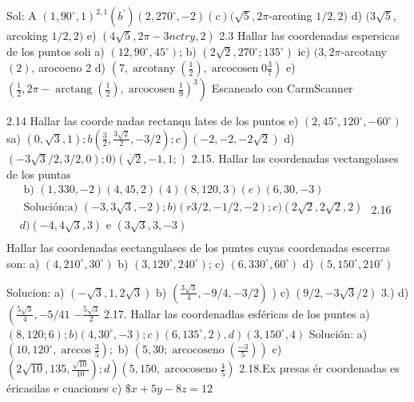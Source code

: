 Sol: A $\left(1,90^{\circ}, 1\right)^{2,1}\left(b^{\prime}\right)\left(2,270^{\circ},-2\right)(c)(\sqrt{5}, 2 \pi$-arcoting $1 / 2,2)$
d) $(3 \sqrt{5}$, arcoking $1 / 2,2)$ e) $(4 \sqrt{5}, 2 \pi-3 n c t r y, 2)$
2.3 Hallar las coordenadas espersicas de los puntos
soli a) $\left(12,90^{\circ}, 45^{\circ}\right)$; b) $\left(2 \sqrt{2}, 270^{\circ} ; 135^{\circ}\right)$ ic) $(3,2 \pi$-arcotany $(2)$, arocoeno 2 d) $\left(7, \operatorname{arcotany}\left(\frac{1}{2}\right), \operatorname{arcocosen} 0 \frac{3}{7}\right)$ e) $\left.\left(\frac{1}{2}, 2 \pi-\operatorname{arctang}\left(\frac{1}{2}\right), \operatorname{arcocosen} \frac{1}{9}\right)^3\right)$
Escaneado con CarmScanner




2.14 Hallar las coorde nadas rectanqu lates de los puntos
e) $\left(2,45^{\circ}, 120^{\circ},-60^{\circ}\right)$
sa) $\left.(0, \sqrt{3}, 1) ; b\left(\frac{3}{2}, \frac{3 \sqrt{2}}{2},-3 / 2\right) ; c\right)(-2,-2,-2 \sqrt{2})$
d) $(-3 \sqrt{3} / 2,3 / 2,0) ; 0)(\sqrt{2},-1,1 ;)$
2.15. Hallar las coordenadas vectangolases de los puntas
$\begin{aligned} & \text { b) }(1,330,-2)(4,45,2)(4)(8,120,3)(e)(6,30,-3) \\ &\text { Solución:a) }(-3,3 \sqrt{3},-2) ; b)(r 3 / 2,-1 / 2,-2) ; c)(2 \sqrt{2}, 2 \sqrt{2}, 2) \\ &d)(-4,4 \sqrt{3}, 3) \text { e }(3 \sqrt{3}, 3,-3) \\ &\end{aligned}$
2.16 Hallar las coordenadas eectangulases de los puntes cuyas coordenadas escerras son: a) $\left(4,210^{\circ}, 30^{\circ}\right)$
b) $\left(3,120^{\circ}, 240^{\circ}\right)$; c) $\left(6,330^{\circ}, 60^{\circ}\right)$ d) $\left(5,150^{\circ}, 210^{\circ}\right)$

Solucion: a) $(-\sqrt{3}, 1,2 \sqrt{3})$ b) $\left(\frac{3 \sqrt{3}}{4},-9 / 4,-3 / 2\right)$
)
c) $(9 / 2,-3 \sqrt{3} / 2)$
3.) d) $\left(\frac{5 \sqrt{3}}{4},-5 / 41\right.$
$-\frac{5 \sqrt{3}}{2}$
2.17. Hallar las coordenadlas esféricas de los puntes a) $\left.\left.(8,120 ; 6) ; b)\left(4,30^{\circ},-3\right) ; c\right)\left(6,135^{\circ}, 2\right), d\right)\left(3,150^{\circ}, 4\right)$ Solución: a) $\left(10,120^{\circ}, \arccos \frac{3}{5}\right) ;$ b) $\left(5,30 ; \operatorname{arcocoseno}\left(\frac{-3}{5}\right)\right)$
c) $\left.\left(2 \sqrt{10}, 135, \frac{\sqrt{10}}{10}\right) ; d\right)\left(5,150, \operatorname{arcocoseno} \frac{4}{5}\right)$
2.18.Ex presas ér coordenadas es éricasilas e cuaciones c) $\$ x+5 y-8 z=12$

